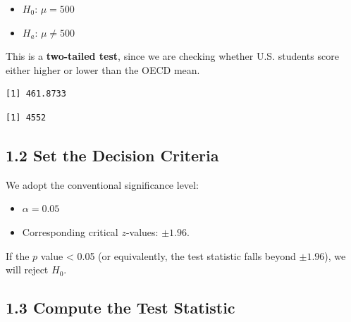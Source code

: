 \documentclass[
  letterpaper,
  DIV=11,
  numbers=noendperiod]{scrreprt}
\newenvironment{Shaded}{\begin{snugshade}}{\end{snugshade}}
\newcommand{\AttributeTok}[1]{\textcolor[rgb]{0.40,0.45,0.13}{#1}}
\newcommand{\CommentTok}[1]{\textcolor[rgb]{0.37,0.37,0.37}{#1}}
\newcommand{\ConstantTok}[1]{\textcolor[rgb]{0.56,0.35,0.01}{#1}}
\newcommand{\FunctionTok}[1]{\textcolor[rgb]{0.28,0.35,0.67}{#1}}
\newcommand{\NormalTok}[1]{\textcolor[rgb]{0.00,0.23,0.31}{#1}}
\newcommand{\OtherTok}[1]{\textcolor[rgb]{0.00,0.23,0.31}{#1}}
\newcommand{\SpecialCharTok}[1]{\textcolor[rgb]{0.37,0.37,0.37}{#1}}
\providecommand{\tightlist}{%
  \setlength{\itemsep}{0pt}\setlength{\parskip}{0pt}}
\begin{document}
\begin{itemize}
\tightlist
\item
  \(H_0:\,\mu=500\)
\item
  \(H_a:\,\mu\ne500\)
\end{itemize}

This is a \textbf{two-tailed test}, since we are checking whether U.S.
students score either higher or lower than the OECD mean.

\begin{Shaded}
\end{Shaded}

\begin{verbatim}
[1] 461.8733
\end{verbatim}

\begin{verbatim}
[1] 4552
\end{verbatim}

\subsection*{1.2 Set the Decision
Criteria}\label{set-the-decision-criteria}

We adopt the conventional significance level:

\begin{itemize}
\tightlist
\item
  \(\alpha=0.05\)
\item
  Corresponding critical \(z\)-values: \(\pm1.96\).
\end{itemize}

If the \(p\) value \textless{} 0.05 (or equivalently, the test statistic
falls beyond \(\pm1.96\)), we will reject \(H_0\).

\subsection*{1.3 Compute the Test
Statistic}\label{compute-the-test-statistic}
\end{document}
